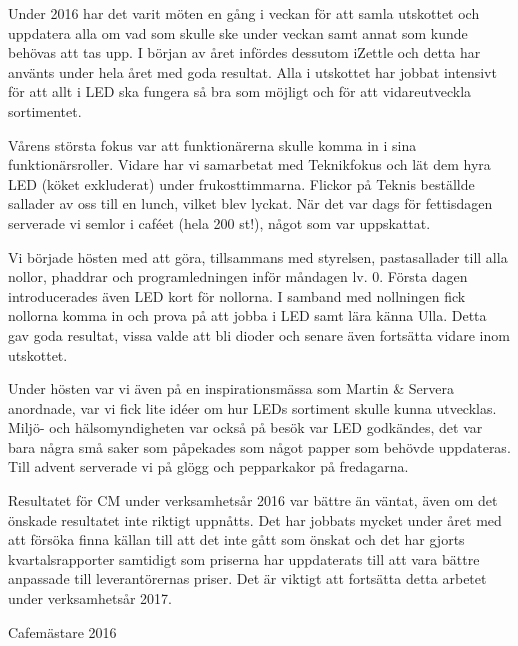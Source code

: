 \documentclass[../_main/handlingar.tex]{subfiles}
\begin{document}
Under 2016 har det varit möten en gång i veckan för att samla utskottet och uppdatera alla om vad som skulle ske under veckan samt annat som kunde behövas att tas upp. I början av året infördes dessutom iZettle och detta har använts under hela året med goda resultat. Alla i utskottet har jobbat intensivt för att allt i LED ska fungera så bra som möjligt och för att vidareutveckla sortimentet.

Vårens största fokus var att funktionärerna skulle komma in i sina funktionärsroller. Vidare har vi samarbetat med Teknikfokus och lät dem hyra LED (köket exkluderat) under frukosttimmarna. Flickor på Teknis beställde sallader av oss till en lunch, vilket blev lyckat. När det var dags för fettisdagen serverade vi semlor i caféet (hela 200 st!), något som var uppskattat.

Vi började hösten med att göra, tillsammans med styrelsen, pastasallader till alla nollor, phaddrar och programledningen inför måndagen lv. 0. Första dagen introducerades även LED kort för nollorna. I samband med nollningen fick nollorna komma in och prova på att jobba i LED samt lära känna Ulla. Detta gav goda resultat, vissa valde att bli dioder och senare även fortsätta vidare inom utskottet.

Under hösten var vi även på en inspirationsmässa som Martin \& Servera anordnade, var vi fick lite idéer om hur LEDs sortiment skulle kunna utvecklas. Miljö- och hälsomyndigheten var också på besök var LED godkändes, det var bara några små saker som påpekades som något papper som behövde uppdateras. Till advent serverade vi på glögg och pepparkakor på fredagarna.

Resultatet för CM under verksamhetsår 2016 var bättre än väntat, även om det önskade resultatet inte riktigt uppnåtts. Det har jobbats mycket under året med att försöka finna källan till att det inte gått som önskat och det har gjorts kvartalsrapporter samtidigt som priserna har uppdaterats till att vara bättre anpassade till leverantörernas priser. Det är viktigt att fortsätta detta arbetet under verksamhetsår 2017.
\begin{signatures}{1}
    \mvh
    \signature{Stephanie Mirsky}{Cafemästare 2016}
\end{signatures}
\end{document}
